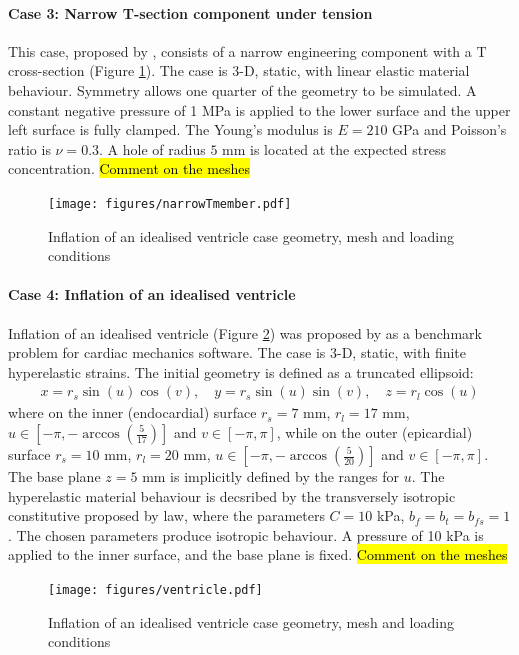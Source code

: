 \documentclass[sn-mathphys,Numbered,draft]{sn-jnl}%
\begin{document}
\paragraph{Case 3: Narrow T-section component under tension}
This case, proposed by \citet{Demirdzic1997}, consists of a narrow engineering component with a T cross-section (Figure \ref{fig:narrowTmember}).
The case is 3-D, static, with linear elastic material behaviour.
Symmetry allows one quarter of the geometry to be simulated.
A constant negative pressure of 1 MPa is applied to the lower surface and the upper left surface is fully clamped.
The Young’s modulus is $E = 210$ GPa and Poisson’s ratio is $\nu = 0.3$.
A hole of radius $5$ mm is located at the expected stress concentration.
\hl{Comment on the meshes}
\begin{figure}[htbp]
   \centering
   \texttt{[image: figures/narrowTmember.pdf]} 
   \caption{Inflation of an idealised ventricle case geometry, mesh and loading conditions}
   \label{fig:narrowTmember}
\end{figure}


\paragraph{Case 4: Inflation of an idealised ventricle}
Inflation of an idealised ventricle (Figure \ref{fig:ventricle}) was proposed by \citet{Land2015} as a benchmark problem for cardiac mechanics software.
The case is 3-D, static, with finite hyperelastic strains.
The initial geometry is defined as a truncated ellipsoid:
\begin{eqnarray}
	x = r_s \sin(u) \cos(v), \quad
	y = r_s \sin(u) \sin(v), \quad
	z = r_l \cos(u)
\end{eqnarray}
where on the inner (endocardial) surface $r_s =7$ mm, $r_l = 17$ mm, $u \in \left[-\pi, -\arccos \left( \frac{5}{17} \right) \right]$ and $v \in \left[-\pi, \pi \right]$, while on the outer (epicardial) surface $r_s =10$ mm, $r_l = 20$ mm, $u \in \left[-\pi, -\arccos \left( \frac{5}{20} \right) \right]$ and $v \in \left[-\pi, \pi \right]$.
The base plane $z = 5$ mm is implicitly defined by the ranges for $u$.
The hyperelastic material behaviour is decsribed by the transversely isotropic constitutive proposed by \citet{Guccione} law, where the parameters $C = 10$ kPa, $b_f = b_t = b_{fs} = 1$.
The chosen parameters produce isotropic behaviour.
A pressure of 10 kPa is applied to the inner surface, and the base plane is fixed.
\hl{Comment on the meshes}
\begin{figure}[htbp]
   \centering
   \texttt{[image: figures/ventricle.pdf]} 
   \caption{Inflation of an idealised ventricle case geometry, mesh and loading conditions}
   \label{fig:ventricle}
\end{figure}
\end{document}

